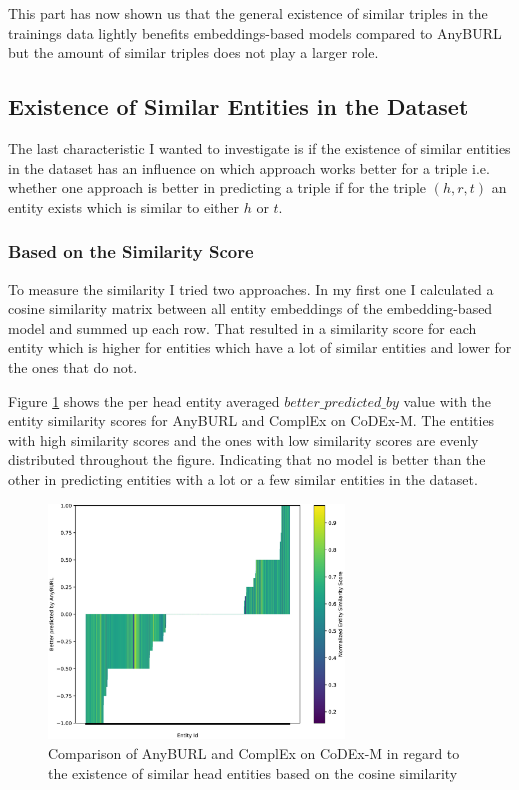 This part has now shown us that the general existence of similar triples in the trainings data lightly benefits embeddings-based models compared to AnyBURL but the amount of similar triples does not play a larger role.

\subsection{Existence of Similar Entities in the Dataset}
The last characteristic I wanted to investigate is if the existence of similar entities in the dataset has an influence on which approach works better for a triple i.e. whether one approach is better in predicting a triple if for the triple $(h,r,t)$ an entity exists which is similar to either $h$ or $t$.

\subsubsection{Based on the Similarity Score}

To measure the similarity I tried two approaches. In my first one I calculated a cosine similarity matrix between all entity embeddings of the embedding-based model and summed up each row. That resulted in a similarity score for each entity which is higher for entities which have a lot of similar entities and lower for the ones that do not. 

Figure \ref{fig:head_similarity_anyburl_complex_codex} shows the per head entity averaged $better\_predicted\_by$ value with the entity similarity scores for AnyBURL and ComplEx on CoDEx-M. The entities with high similarity scores and the ones with low similarity scores are evenly distributed throughout the figure. Indicating that no model is better than the other in predicting entities with a lot or a few similar entities in the dataset.

\begin{figure}[H]
\centering
\includegraphics[width=0.7\textwidth]{images/head_similarity_anyburl_complex_codex.PNG}
\caption{Comparison of AnyBURL and ComplEx on CoDEx-M in regard to the existence of similar head entities based on the cosine similarity}
\label{fig:head_similarity_anyburl_complex_codex}
\end{figure}

